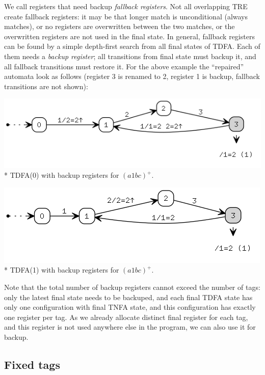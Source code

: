 \documentclass{article}
\theoremstyle{definition}
\begin{document}
\begin{multicols}{2}
We call registers that need backup \emph{fallback registers}.
Not all overlapping TRE create fallback registers:
it may be that longer match is unconditional (always matches),
or no registers are overwritten between the two matches,
or the overwritten registers are not used in the final state.
In general, fallback registers can be found by a simple depth-first search from all final states of TDFA.
Each of them needs a \emph{backup register};
all transitions from final state must backup it, and all fallback transitions must restore it.
For the above example the ``repaired'' automata look as follows
(register 3 is renamed to 2, register 1 is backup, fallback transitions are not shown):
\begin{center}
\includegraphics[width=0.85\linewidth]{img/fallback/tdfa0_fallback.png}\\*
\footnotesize{TDFA(0) with backup registers for $(a 1 bc)^+$.} \\
\end{center}
\begin{center}
\includegraphics[width=0.8\linewidth]{img/fallback/tdfa1_fallback.png}\\*
\footnotesize{TDFA(1) with backup registers for $(a 1 bc)^+$.} \\
\end{center}
Note that the total number of backup registers cannot exceed the number of tags:
only the latest final state needs to be backuped,
and each final TDFA state has only one configuration with final TNFA state,
and this configuration has exactly one register per tag.
As we already allocate distinct final register for each tag,
and this register is not used anywhere else in the program,
we can also use it for backup.

\subsection*{Fixed tags}


\end{multicols}
\end{document}
